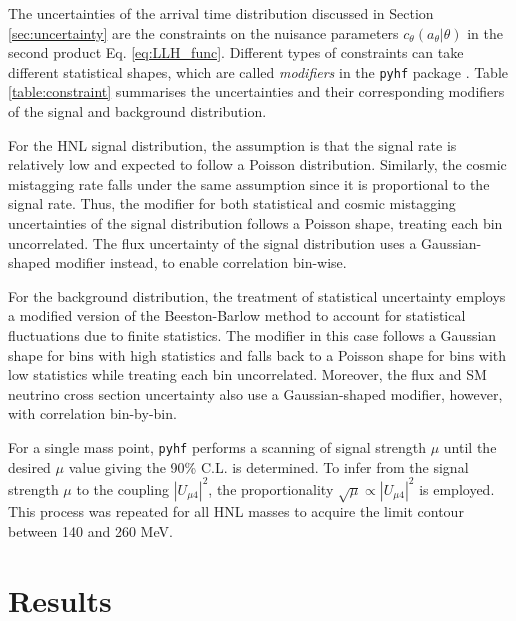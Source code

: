 The uncertainties of the arrival time distribution discussed in Section \ref{sec:uncertainty} are the constraints on the nuisance parameters $c_\theta(a_\theta|\theta)$ in the second product Eq. \ref{eq:LLH_func}.
Different types of constraints can take different statistical shapes, which are called \textit{modifiers} in the \texttt{pyhf} package \cite{pyhf_joss}.
Table \ref{table:constraint} summarises the uncertainties and their corresponding modifiers of the signal and background distribution.

For the HNL signal distribution, the assumption is that the signal rate is relatively low and expected to follow a Poisson distribution.
Similarly, the cosmic mistagging rate falls under the same assumption since it is proportional to the signal rate. 
Thus, the modifier for both statistical and cosmic mistagging uncertainties of the signal distribution follows a Poisson shape, treating each bin uncorrelated. 
The flux uncertainty of the signal distribution uses a Gaussian-shaped modifier instead, to enable correlation bin-wise.

For the background distribution, the treatment of statistical uncertainty employs a modified version of the Beeston-Barlow method \cite{BeestonBarlow} to account for statistical fluctuations due to finite statistics.
The modifier in this case follows a Gaussian shape for bins with high statistics and falls back to a Poisson shape for bins with low statistics while treating each bin uncorrelated.
Moreover, the flux and SM neutrino cross section uncertainty also use a Gaussian-shaped modifier, however, with correlation bin-by-bin.

For a single mass point, \texttt{pyhf} performs a scanning of signal strength $\mu$ until the desired $\mu$ value giving the 90\% C.L. is determined. 
To infer from the signal strength $\mu$ to the coupling $|U_{\mu4}|^{2}$, the proportionality $\sqrt{\mu} \propto |U_{\mu4}|^{2}$ is employed.
This process was repeated for all HNL masses to acquire the limit contour between 140 and 260 MeV.

\section{Results}
\label{sec:result}

